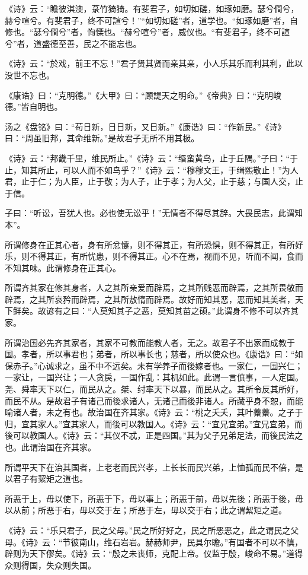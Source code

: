《诗》云：“瞻彼淇澳，菉竹猗猗。有斐君子，如切如磋，如琢如磨。瑟兮僴兮，赫兮喧兮。有斐君子，终不可諠兮！”“如切如磋”者，道学也。“如琢如磨”者，自修也。“瑟兮僴兮”者，恂慄也。“赫兮喧兮”者，威仪也。“有斐君子，终不可諠兮”者，道盛德至善，民之不能忘也。

《诗》云：“於戏，前王不忘！”君子贤其贤而亲其亲，小人乐其乐而利其利，此以没世不忘也。

《康诰》曰：“克明德。”《大甲》曰：“顾諟天之明命。”《帝典》曰：“克明峻德。”皆自明也。

汤之《盘铭》曰：“苟日新，日日新，又日新。”《康诰》曰：“作新民。”《诗》曰：“周虽旧邦，其命维新。”是故君子无所不用其极。

《诗》云：“邦畿千里，维民所止。”《诗》云：“缗蛮黄鸟，止于丘隅。”子曰：“于止，知其所止，可以人而不如鸟乎？”《诗》云：“穆穆文王，于缉熙敬止！”为人君，止于仁；为人臣，止于敬；为人子，止于孝；为人父，止于慈；与国人交，止于信。

子曰：“听讼，吾犹人也。必也使无讼乎！”无情者不得尽其辞。大畏民志，此谓知本”。

所谓修身在正其心者，身有所忿懥，则不得其正，有所恐惧，则不得其正，有所好乐，则不得其正，有所忧患，则不得其正。心不在焉，视而不见，听而不闻，食而不知其味。此谓修身在正其心。

所谓齐其家在修其身者，人之其所亲爱而辟焉，之其所贱恶而辟焉，之其所畏敬而辟焉，之其所哀矜而辟焉，之其所敖惰而辟焉。故好而知其恶，恶而知其美者，天下鲜矣。故谚有之曰：“人莫知其子之恶，莫知其苗之硕。”此谓身不修不可以齐其家。

所谓治国必先齐其家者，其家不可教而能教人者，无之。故君子不出家而成教于国。孝者，所以事君也；弟者，所以事长也；慈者，所以使众也。《康诰》曰：“如保赤子。”心诚求之，虽不中不远矣。未有学养子而後嫁者也。一家仁，一国兴仁；一家让，一国兴让；一人贪戾，一国作乱：其机如此。此谓一言偾事，一人定国。尧、舜率天下以仁，而民从之。桀、纣率天下以暴，而民从之。其所令反其所好，而民不从。是故君子有诸己而後求诸人，无诸己而後非诸人。所藏乎身不恕，而能喻诸人者，未之有也。故治国在齐其家。《诗》云：“桃之夭夭，其叶蓁蓁。之子于归，宜其家人。”宜其家人，而後可以教国人。《诗》云：“宜兄宜弟。”宜兄宜弟，而後可以教国人。《诗》云：“其仪不忒，正是四国。”其为父子兄弟足法，而後民法之也。此谓治国在齐其家。

所谓平天下在治其国者，上老老而民兴孝，上长长而民兴弟，上恤孤而民不倍，是以君子有絜矩之道也。

所恶于上，毋以使下，所恶于下，毋以事上；所恶于前，毋以先後；所恶于後，毋以从前；所恶于右，毋以交于左；所恶于左，毋以交于右；此之谓絜矩之道。

《诗》云：“乐只君子，民之父母。”民之所好好之，民之所恶恶之，此之谓民之父母。《诗》云：“节彼南山，维石岩岩。赫赫师尹，民具尔瞻。”有国者不可以不慎，辟则为天下僇矣。《诗》云：“殷之未丧师，克配上帝。仪监于殷，峻命不易。”道得众则得国，失众则失国。

